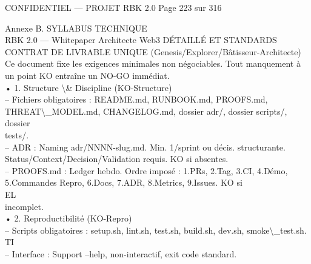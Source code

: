 \vspace{0.5em}
\vspace{0.5em}
\vspace{0.5em}
\begin{confidential}CONFIDENTIEL — PROJET RBK 2.0                      Page 223 sur 316\end{confidential}
Annexe B. SYLLABUS TECHNIQUE\\
RBK 2.0 — Whitepaper Architecte Web3                                                                                    DÉTAILLÉ ET STANDARDS\\
\vspace{0.5em}
\vspace{0.5em}
\vspace{0.5em}
\vspace{0.5em}
CONTRAT DE LIVRABLE UNIQUE (Genesis/Explorer/Bâtisseur-Architecte)\\
Ce document fixe les exigences minimales non négociables. Tout manquement à un point KO entraîne un NO-GO immédiat.\\
• 1. Structure \textbackslash{}& Discipline (KO-Structure)\\
– Fichiers obligatoires : README.md, RUNBOOK.md, PROOFS.md, THREAT\textbackslash{}_MODEL.md, CHANGELOG.md, dossier adr/, dossier scripts/, dossier\\
tests/.\\
– ADR : Naming adr/NNNN-slug.md. Min. 1/sprint ou décis. structurante. Status/Context/Decision/Validation requis. KO si absentes.\\
– PROOFS.md : Ledger hebdo. Ordre imposé : 1.PRs, 2.Tag, 3.CI, 4.Démo, 5.Commandes Repro, 6.Docs, 7.ADR, 8.Metrics, 9.Issues. KO si\\
\vspace{0.5em}
\vspace{0.5em}
\vspace{0.5em}
\vspace{0.5em}
EL\\
incomplet.\\
• 2. Reproductibilité (KO-Repro)\\
– Scripts obligatoires : setup.sh, lint.sh, test.sh, build.sh, dev.sh, smoke\textbackslash{}_test.sh.\\
\vspace{0.5em}
\vspace{0.5em}
\vspace{0.5em}
\vspace{0.5em}
TI\\
– Interface : Support --help, non-interactif, exit code standard.\\

